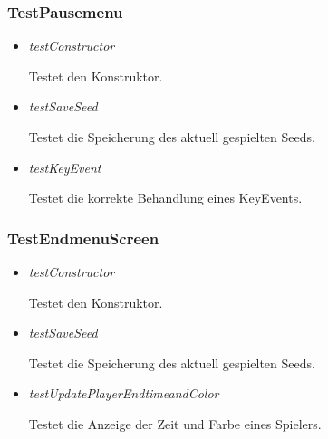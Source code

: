 \subsubsection{TestPausemenu}
\begin{itemize}
    \item \textit{testConstructor}
        \begin{leftbar}[0.9\linewidth]
            Testet den Konstruktor.
        \end{leftbar}
    \item \textit{testSaveSeed}
        \begin{leftbar}[0.9\linewidth]
            Testet die Speicherung des aktuell gespielten Seeds.
        \end{leftbar}
    \item \textit{testKeyEvent}
        \begin{leftbar}[0.9\linewidth]
            Testet die korrekte Behandlung eines KeyEvents.
        \end{leftbar}
\end{itemize}

\subsubsection{TestEndmenuScreen}
\begin{itemize}
    \item \textit{testConstructor}
        \begin{leftbar}[0.9\linewidth]
            Testet den Konstruktor.
        \end{leftbar}
    \item \textit{testSaveSeed}
        \begin{leftbar}[0.9\linewidth]
            Testet die Speicherung des aktuell gespielten Seeds.
        \end{leftbar}
    \item \textit{testUpdatePlayerEndtimeandColor}
        \begin{leftbar}[0.9\linewidth]
            Testet die Anzeige der Zeit und Farbe eines Spielers.
        \end{leftbar}
\end{itemize}